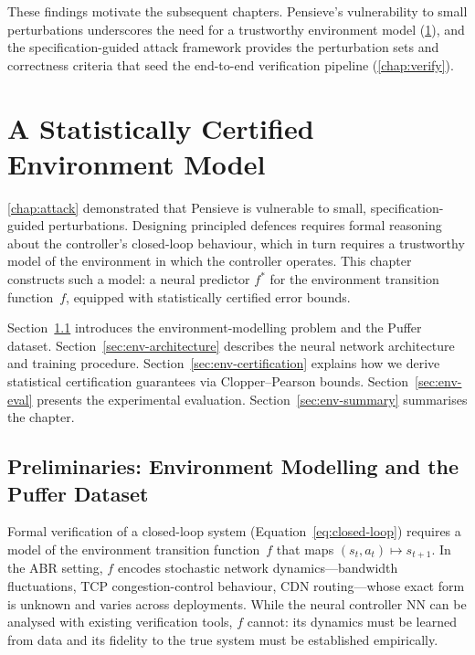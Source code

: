 \documentclass[thesis]{uofithesis} %
\begin{document}
    These findings motivate the subsequent chapters.  Pensieve's
    vulnerability to small perturbations underscores the need for a
    trustworthy environment model (\ref{chap:env}), and the
    specification-guided attack framework provides the perturbation
    sets and correctness criteria that seed the end-to-end verification
    pipeline (\ref{chap:verify}).



\section{A Statistically Certified Environment Model}
\label{chap:env}

    \ref{chap:attack} demonstrated that Pensieve is vulnerable to
    small, specification-guided perturbations.  Designing principled
    defences requires formal reasoning about the controller's closed-loop
    behaviour, which in turn requires a trustworthy model of the
    environment in which the controller operates.  This chapter constructs
    such a model: a neural predictor $f^{\ast}$ for the environment
    transition function~$f$, equipped with statistically certified error
    bounds.

    Section~\ref{sec:env-prelim} introduces the environment-modelling
    problem and the Puffer dataset.
    Section~\ref{sec:env-architecture} describes the neural network
    architecture and training procedure.
    Section~\ref{sec:env-certification} explains how we derive statistical
    certification guarantees via Clopper--Pearson bounds.
    Section~\ref{sec:env-eval} presents the experimental evaluation.
    Section~\ref{sec:env-summary} summarises the chapter.


    \subsection{Preliminaries: Environment Modelling and the Puffer Dataset}
    \label{sec:env-prelim}

    Formal verification of a closed-loop system
    (Equation~\ref{eq:closed-loop}) requires a model of the environment
    transition function~$f$ that maps $(s_t, a_t) \mapsto s_{t+1}$.
    In the ABR setting, $f$ encodes stochastic network dynamics---bandwidth
    fluctuations, TCP congestion-control behaviour, CDN routing---whose
    exact form is unknown and varies across deployments.  While the neural
    controller $\mathrm{NN}$ can be analysed with existing verification
    tools, $f$ cannot: its dynamics must be learned from data and its
    fidelity to the true system must be established empirically.
\end{document}
